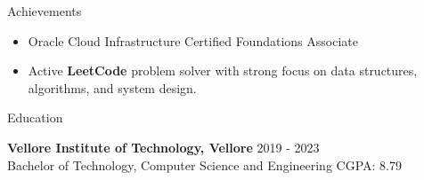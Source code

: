 \documentclass{resume}
\begin{document}
\begin{rSection}{Achievements}

\begin{itemize}
    \item Oracle Cloud Infrastructure Certified Foundations Associate
    \item Active \textbf{LeetCode} problem solver with strong focus on data structures, algorithms, and system design.
\end{itemize}

\end{rSection}

\begin{rSection}{Education}

\textbf{Vellore Institute of Technology, Vellore} \textbar{} 2019 - 2023 \\
Bachelor of Technology, Computer Science and Engineering \textbar{} CGPA: 8.79

\end{rSection}
\end{document}
